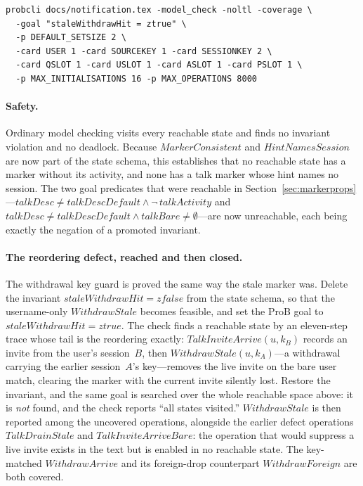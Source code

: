 \documentclass[a4paper,10pt,fleqn]{article}
\begin{document}
\begin{verbatim}
probcli docs/notification.tex -model_check -noltl -coverage \
  -goal "staleWithdrawHit = ztrue" \
  -p DEFAULT_SETSIZE 2 \
  -card USER 1 -card SOURCEKEY 1 -card SESSIONKEY 2 \
  -card QSLOT 1 -card USLOT 1 -card ASLOT 1 -card PSLOT 1 \
  -p MAX_INITIALISATIONS 16 -p MAX_OPERATIONS 8000
\end{verbatim}

\paragraph{Safety.}  Ordinary model checking visits every reachable state
and finds no invariant violation and no deadlock.  Because
$MarkerConsistent$ and $HintNamesSession$ are now part of the state
schema, this establishes that no reachable state has a marker without its
activity, and none has a talk marker whose hint names no session.  The
two goal predicates that were reachable in
Section~\ref{sec:markerprops}---$talkDesc \neq talkDescDefault \land
\lnot\, talkActivity$ and $talkDesc \neq talkDescDefault \land talkBare
\neq \emptyset$---are now unreachable, each being exactly the negation of a
promoted invariant.

\paragraph{The reordering defect, reached and then closed.}  The withdrawal
key guard is proved the same way the stale marker was.  Delete the invariant
$staleWithdrawHit = zfalse$ from the state schema, so that the username-only
$WithdrawStale$ becomes feasible, and set the ProB goal to
$staleWithdrawHit = ztrue$.  The check finds a reachable state by an
eleven-step trace whose tail is the reordering exactly:
$TalkInviteArrive(u, k_B)$ records an invite from the user's session~$B$,
then $WithdrawStale(u, k_A)$---a withdrawal carrying the earlier session~$A$'s
key---removes the live invite on the bare user match, clearing the marker with
the current invite silently lost.  Restore the invariant, and the same goal is
searched over the whole reachable space above: it is \emph{not} found, and the
check reports ``all states visited.''  $WithdrawStale$ is then reported among
the uncovered operations, alongside the earlier defect operations
$TalkDrainStale$ and $TalkInviteArriveBare$: the operation that would suppress
a live invite exists in the text but is enabled in no reachable state.  The
key-matched $WithdrawArrive$ and its foreign-drop counterpart $WithdrawForeign$
are both covered.
\end{document}
